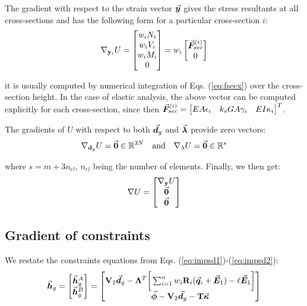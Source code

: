 \begin{appendices}
\noindent The gradient with respect to the strain vector $\vec{\boldsymbol{y}}$ gives the
stress resultants at all cross-sections and has the following form for a
particular cross-section $i$:
\begin{gather}
	\nabla_{\mathbf{y}_i}U = \begin{bmatrix}
		w_iN_i\\ w_iV_i\\ w_iM_i\\ 0
	\end{bmatrix} = w_i\begin{bmatrix}
		\vec{\boldsymbol{F}}_{sec}^{(i)}\\ 0
	\end{bmatrix}
	\label{eq:straingrad}
\end{gather}

\noindent it is usually computed by numerical integration of Eqs.
(\ref{eq:fsecx}) over the cross-section height. In the case of elastic
analysis, the above vector can be computed explicitly for each cross-section,
since then $\vec{\boldsymbol{F}}_{sec}^{(i)} = \begin{bmatrix}
	EA\epsilon_i & k_sGA\gamma_i & EI\kappa_i
\end{bmatrix}^T$.

The gradients of $U$ with respect to both $\vec{\boldsymbol{d}}_g$ and $\vec{\boldsymbol{\lambda}}$
provide zero vectors:
\begin{gather}
	\nabla_{\mathbf{d}_g}U = \vec{\boldsymbol{0}}\in\mathbb{R}^{3N}\quad\text{and}\quad
	\nabla_{\mathbf{\lambda}}U = \vec{\boldsymbol{0}}\in\mathbb{R}^{s}\nonumber
\end{gather}

\noindent where $s=m + 3n_{el}$, $n_{el}$ being the number of elements.
Finally, we then get:
\begin{gather}
	\nabla U = \begin{bmatrix}
		\nabla_{\mathbf{y}}U\\ \vec{\boldsymbol{0}}\\ \vec{\boldsymbol{0}}
	\end{bmatrix}
\end{gather}
\subsection{Gradient of constraints}

We restate the constraints equations from Eqs.
(\ref{eq:impsd1})-(\ref{eq:impsd2}):
\begin{gather}
	\vec{\boldsymbol{h}}_g = \begin{bmatrix}
		\vec{\boldsymbol{h}}_g^A\\ \vec{\boldsymbol{h}}_g^B
	\end{bmatrix} =
	\begin{bmatrix}
		\mathbf{V}_1\vec{\boldsymbol{d}}_g - \mathbf{\Lambda}^T\bigg[\sum_{i=1}^n
		w_i\mathbf{R}_i(\vec{\boldsymbol{q}}_i+\vec{\boldsymbol{E}}_1) - \ell\vec{\boldsymbol{E}}_1\bigg]\\
		\vec{\boldsymbol{\phi}}-\mathbf{V}_2\vec{\boldsymbol{d}}_g - \mathbf{T}\vec{\boldsymbol{\kappa}}
	\end{bmatrix}\nonumber
\end{gather}


\end{appendices}
